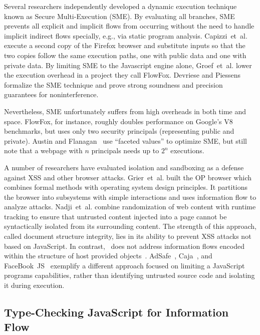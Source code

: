 Several researchers independently developed a dynamic execution technique known as Secure Multi-Execution (SME).
By evaluating all branches, SME prevents all explicit and implicit flows from occurring without the need to handle implicit indirect flows specially, e.g., via static program analysis.
Capizzi~et~al.\cite{capizzi.etal+08} execute a second copy of the Firefox browser and substitute inputs so that the two copies follow the same execution paths, one with public data and one with private data.
By limiting SME to the Javascript engine alone, Groef~et~al.\cite{groef.etal+12} lower the execution overhead in a project they call FlowFox.
Devriese and Piessens~\cite{devriese.piessens+10} formalize the SME technique and prove strong soundness and precision guarantees for noninterference.

Nevertheless, SME unfortunately suffers from high overheads in both time and space.
FlowFox, for instance, roughly doubles performance on Google's V8 benchmarks, but uses only two security principals (representing public and private).
Austin and Flanagan~\cite{austin.flanagan+12} use ``faceted values'' to optimize SME, but still note that a webpage with $n$ principals needs up to $2^n$ executions.

A number of researchers have evaluated isolation and sandboxing as a defense against XSS and other browser attacks.
Grier~et~al.\cite{grier.etal+08} built the OP browser which combines formal methods with operating system design principles.
It partitions the browser into subsystems with simple interactions and uses information flow to analyze attacks.
Nadji~et~al.\cite{nadji.etal+09} combine randomization of web content with runtime tracking to ensure that untrusted content injected into a page cannot be syntactically isolated from its surrounding content.
The strength of this approach, called document structure integrity, lies in its ability to prevent XSS attacks not based on JavaScript.
In contrast, \JitFlow\ does not address information flows encoded within the structure of host provided objects~\cite{russo.etal+09}.
AdSafe~\cite{adsafe}, Caja~\cite{caja}, and FaceBook~JS~\cite{facebookjs} exemplify a different approach focused on limiting a JavaScript programs capabilities, rather than identifying untrusted source code and isolating it during execution.

\subsection{Type-Checking JavaScript for Information Flow}

